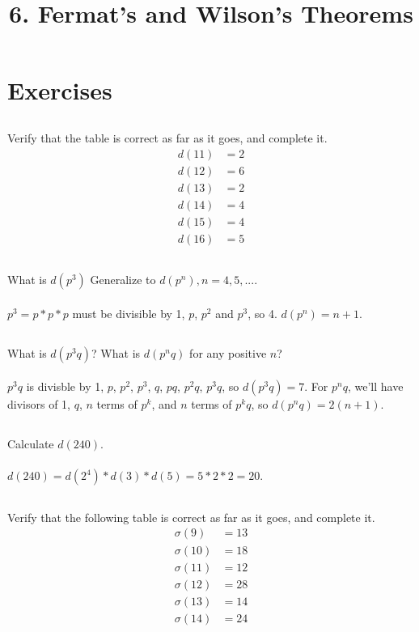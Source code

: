 \documentclass{article}
\begin{document}
\newcommand{\Z}{\mathbb{Z}}
\newcommand{\s}{\sigma}
\newcommand{\Mod}[1]{\ (\mathrm{mod}\ #1)}

\title{6. Fermat's and Wilson's Theorems}
\section{Exercises}

\subsection{}
Verify that the table is correct as far as it goes, and complete it.
\begin{align*}
    d(11) &= 2\\
    d(12) &= 6\\
    d(13) &= 2\\
    d(14) &= 4\\
    d(15) &= 4\\
    d(16) &= 5
\end{align*}

\subsection{}
What is $d(p^3)$ Generalize to $d(p^n), n = 4, 5, ...$.\\~\\
$p^3 = p * p * p$ must be divisible by 1, $p$, $p^2$ and $p^3$, so 4.
$d(p^n) = n + 1$.

\subsection{}
What is $d(p^3q)$? What is $d(p^nq)$ for any positive $n$?\\~\\
$p^3q$ is divisble by 1, $p$, $p^2$, $p^3$, $q$, $pq$, $p^2q$, $p^3q$, so $d(p^3q) = 7$.
For $p^nq$, we'll have divisors of 1, $q$, $n$ terms of $p^k$, and $n$ terms of
$p^kq$, so $d(p^nq) = 2(n + 1)$.

\subsection{}
Calculate $d(240)$.\\~\\
$d(240) = d(2^4)*d(3)*d(5) = 5 * 2 * 2 = 20$.

\subsection{}
Verify that the following table is correct as far as it goes, and complete it.
\begin{align*}
    \s(9) &= 13\\
    \s(10) &= 18\\
    \s(11) &= 12\\
    \s(12) &= 28\\
    \s(13) &= 14\\
    \s(14) &= 24\\
\end{align*}
\end{document}

